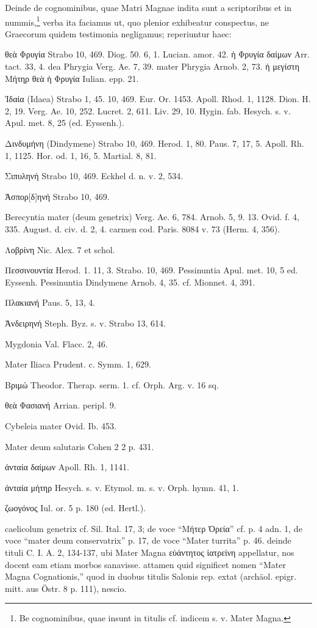 \documentclass[a4paper, 11pt, oneside, polutonikogreek, german, twocolumn]{article}
\begin{document}
Deinde de cognominibus, quae Matri Magnae indita sunt a scriptoribus et in nummis,\footnote{Be cognominibus, quae insunt in titulis cf. indicem s. v. Mater Magna.} verba ita faciamus ut, quo plenior exhibeatur conspectus, ne Graecorum quidem testimonia negligamus; reperiuntur haec:

θεὰ Φρυγία Strabo 10, 469. Diog. 50. 6, 1. Lucian. amor. 42. ἡ Φρυγία δαίμων Arr. tact. 33, 4. dea Phrygia Verg. Ae. 7, 39. mater Phrygia Arnob. 2, 73. ἡ μεγίστη Μήτηρ θεὰ ἡ Φρυγία Iulian. epp. 21.

Ἰδαία (Idaea) Strabo 1, 45. 10, 469. Eur. Or. 1453. Apoll. Rhod. 1, 1128. Dion. H. 2, 19. Verg. Ae. 10, 252. Lucret. 2, 611. Liv. 29, 10. Hygin. fab. Hesych. s. v. Apul. met. 8, 25 (ed. Eyssenh.).

Δινδυμήνη (Dindymene) Strabo 10, 469. Herod. 1, 80. Paus. 7, 17, 5. Apoll. Rh. 1, 1125. Hor. od. 1, 16, 5. Martial. 8, 81.

Σιπυληνή Strabo 10, 469. Eckhel d. n. v. 2, 534.

Ἀσπορ[δ]ηνή Strabo 10, 469.

Berecyntia mater (deum genetrix) Verg. Ae. 6, 784. Arnob. 5, 9. 13. Ovid. f. 4, 335. August. d. civ. d. 2, 4. carmen cod. Paris. 8084 v. 73 (Herm. 4, 356).

Λοβρίνη Nic. Alex. 7 et schol.

Πεσσινουντία Herod. 1. 11, 3. Strabo. 10, 469. Pessinuntia Apul. met. 10, 5 ed. Eyssenh. Pessinuntia Dindymene Arnob. 4, 35. cf. Mionnet. 4, 391.

Πλακιανή Paus. 5, 13, 4.

Ἀνδειρηνή Steph. Byz. s. v. Strabo 13, 614.

Mygdonia Val. Flacc. 2, 46.

Mater Iliaca Prudent. c. Symm. 1, 629.

Βριμώ Theodor. Therap. serm. 1. cf. Orph. Arg. v. 16 sq.

θεὰ Φασιανή Arrian. peripl. 9.

Cybeleia mater Ovid. Ib. 453.

Mater deum salutaris Cohen 2 2 p. 431.

ἀνταία δαίμων Apoll. Rh. 1, 1141.

ἀνταία μήτηρ Hesych. s. v. Etymol. m. s. v. Orph. hymn. 41, 1.

ζωογόνος Iul. or. 5 p. 180 (ed. Hertl.).

caelicolum genetrix cf. Sil. Ital. 17, 3; de voce "`Μήτερ Ὀρεία"' cf. p. 4 adn. 1, de voce "`mater deum conservatrix"' p. 17, de voce "`Mater turrita"' p. 46. deinde tituli C. I. A. 2, 134-137, ubi Mater Magna εὐάντητος ἰατρείνη appellatur, nos docent eam etiam morbos sanavisse. attamen quid significet nomen "`Mater Magna Cognationis,"' quod in duobus titulis Salonis rep. extat (archäol. epigr. mitt. aus Östr. 8 p. 111), nescio.
\end{document}
